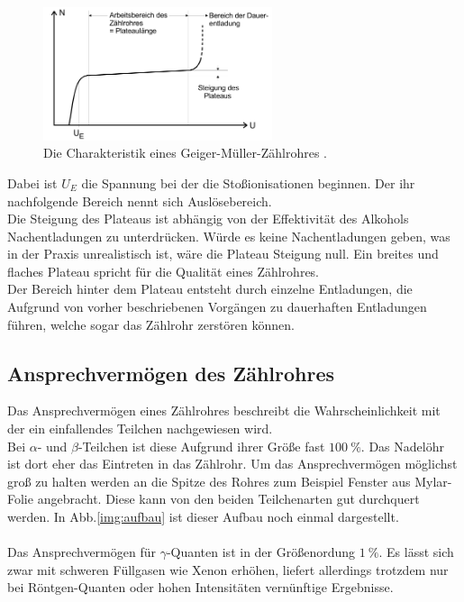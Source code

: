 \begin{figure}[H]
    \centering
    \includegraphics[width=0.6\textwidth]{images/charakteristik.PNG}
    \caption{Die Charakteristik eines Geiger-Müller-Zählrohres \protect \cite{V703}.}
    \label{img:char}
\end{figure}

\noindent
Dabei ist $U_E$ die Spannung bei der die Stoßionisationen beginnen. Der ihr nachfolgende Bereich nennt sich Auslösebereich.\\
Die Steigung des Plateaus ist abhängig von der Effektivität des Alkohols Nachentladungen zu unterdrücken. Würde es keine Nachentladungen geben, was in der Praxis unrealistisch ist, wäre die Plateau Steigung null.
Ein breites und flaches Plateau spricht für die Qualität eines Zählrohres.\\
Der Bereich hinter dem Plateau entsteht durch einzelne Entladungen, die Aufgrund von vorher beschriebenen Vorgängen zu dauerhaften Entladungen führen, welche sogar das Zählrohr zerstören können.\\

\subsection{Ansprechvermögen des Zählrohres}

\noindent
Das Ansprechvermögen eines Zählrohres beschreibt die Wahrscheinlichkeit mit der ein einfallendes Teilchen nachgewiesen wird.\\
Bei $\alpha$- und $\beta$-Teilchen ist diese Aufgrund ihrer Größe fast $\SI{100}{\percent}$. Das Nadelöhr ist dort eher das Eintreten in das Zählrohr. 
Um das Ansprechvermögen möglichst groß zu halten werden an die Spitze des Rohres zum Beispiel Fenster aus Mylar-Folie angebracht. 
Diese kann von den beiden Teilchenarten gut durchquert werden.
In Abb.\ref{img:aufbau} ist dieser Aufbau noch einmal dargestellt.\\\\
Das Ansprechvermögen für $\gamma$-Quanten ist in der Größenordung $\SI{1}{\percent}$. Es lässt sich zwar mit schweren Füllgasen wie Xenon erhöhen, liefert allerdings trotzdem nur bei Röntgen-Quanten
oder hohen Intensitäten vernünftige Ergebnisse.

